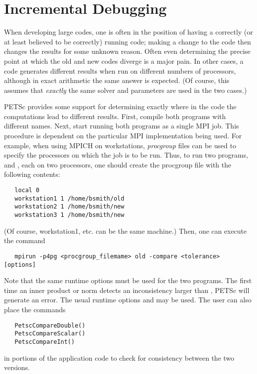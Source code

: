 \section{Incremental Debugging} 

When developing large codes, one is often in the position of having a
correctly (or at least believed to be correctly) running code; making
a change to the code then changes the results for some unknown reason.
Often even determining the precise point at which the old and new
codes diverge is a major pain.  In other cases, a code generates
different results when run on different numbers of processors,
although in exact arithmetic the same answer is expected. (Of course,
this assumes that {\em exactly} the same solver and parameters are
used in the two cases.)
 
PETSc provides some support for determining exactly where in the code
the computations lead to different results. First, compile both programs
with different names.  Next, start running
both programs as a single MPI job. This procedure is dependent on the particular
MPI implementation being used.
For example, when using MPICH on workstations, 
{\em procgroup} files can be used to specify the processors on which the job is
to be run.  Thus, to run two programs,  and ,
each on two processors, one should create the procgroup file with the
following contents:
\begin{verbatim}
   local 0
   workstation1 1 /home/bsmith/old
   workstation2 1 /home/bsmith/new
   workstation3 1 /home/bsmith/new
\end{verbatim}
(Of course, workstation1, etc. can be the same machine.) Then, one can
execute the command
\begin{verbatim}
   mpirun -p4pg <procgroup_filemame> old -compare <tolerance> [options]
\end{verbatim}
Note that the same runtime options must be used for the two programs.
The first time an inner product or norm detects an inconsistency larger
than , PETSc will generate an error. The usual runtime
options  and  may 
be used.   The user can also place the commands 
\begin{verbatim}
   PetscCompareDouble()
   PetscCompareScalar()
   PetscCompareInt()
\end{verbatim}
  
in portions of the application code to check for consistency between
the two versions.
 
